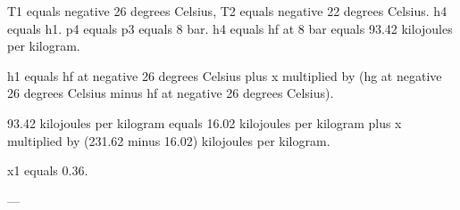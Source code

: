 T1 equals negative 26 degrees Celsius, T2 equals negative 22 degrees Celsius.  
h4 equals h1.  
p4 equals p3 equals 8 bar.  
h4 equals hf at 8 bar equals 93.42 kilojoules per kilogram.  

h1 equals hf at negative 26 degrees Celsius plus x multiplied by (hg at negative 26 degrees Celsius minus hf at negative 26 degrees Celsius).  

93.42 kilojoules per kilogram equals 16.02 kilojoules per kilogram plus x multiplied by (231.62 minus 16.02) kilojoules per kilogram.  

x1 equals 0.36.  

---